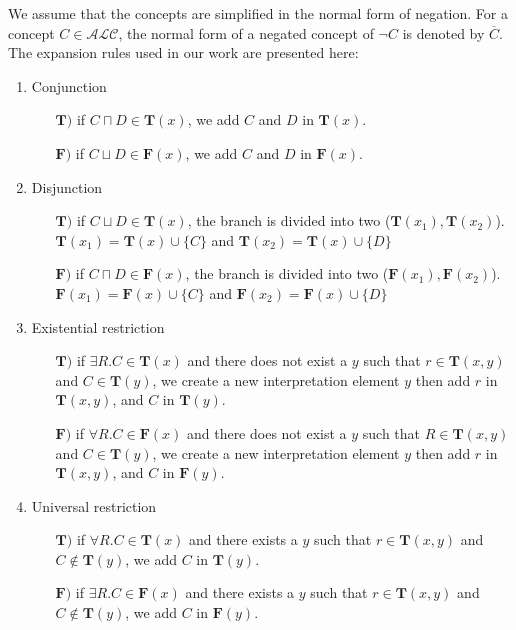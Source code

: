 \documentclass{article}
\begin{document}
We assume that the concepts are simplified in the normal form of negation. For a concept $C \in \mathcal{ALC} $, the normal form of a negated concept of $\neg C$ is denoted by $\overline{C}$.
The expansion rules used in our work are presented here:
\begin{enumerate}
	 \item Conjunction
	       \begin{itemize}
	        \item  [$\mathbf{T)}$] if $C\sqcap D \in \mathbf{T}(x)$, we add $C$ and $D$ in $\mathbf{T}(x)$.
	        \item  [$\mathbf{F)}$] if $C\sqcup D \in \mathbf{F}(x)$, we add $C$ and $D$ in $\mathbf{F}(x)$.
	       \end{itemize}
	 \item Disjunction
	       \begin{itemize}
		\item  [$\mathbf{T)}$]  if $C\sqcup D \in \mathbf{T}(x)$, the branch is divided into two  ($\mathbf{T}(x_1),\mathbf{T}(x_2)$).
			$\mathbf{T}(x_1)= \mathbf{T}(x) \cup \{C\}$ and $\mathbf{T}(x_2)=\mathbf{T}(x) \cup \{D\}$
	        \item  [$\mathbf{F)}$]  if $C\sqcap D \in \mathbf{F}(x)$, the branch is divided into two ($\mathbf{F}(x_1),\mathbf{F}(x_2)$).
	        $\mathbf{F}(x_1)= \mathbf{F}(x) \cup \{C\}$ and $\mathbf{F}(x_2)=\mathbf{F}(x) \cup \{D\}$
	       \end{itemize}
	 \item Existential restriction
	       \begin{itemize}
	       \item  [$\mathbf{T)}$]  if $\exists R.C \in \mathbf{T}(x)$ and there does not exist a $y$ such that $r \in \mathbf{T}(x,y)$ and $C \in \mathbf{T}(y)$, 
	       we create a new interpretation element $y$  then add $r$ in  $\mathbf{T}(x,y)$, and $C$ in $\mathbf{T}(y)$.
	        \item  [$\mathbf{F)}$]  if $\forall R.C \in \mathbf{F}(x)$ and there does not exist a $y$ such that $R \in \mathbf{T}(x,y)$ and $C \in \mathbf{T}(y)$, 
	       we create a new interpretation element $y$ then add $r$ in  $\mathbf{T}(x,y)$, and $C$ in $\mathbf{F}(y)$.
	       \end{itemize}
	 \item Universal restriction
	       \begin{itemize}
 	        \item  [$\mathbf{T)}$]  if $\forall R.C \in \mathbf{T}(x)$ and there exists a $y$ such that $r \in \mathbf{T}(x,y)$ and $C\notin\mathbf{T}(y)$, we add $C$ in  $\mathbf{T}(y)$.
	        \item  [$\mathbf{F)}$]  if $\exists R.C \in \mathbf{F}(x)$ and there exists a $y$ such that $r \in \mathbf{T}(x,y)$ and $C\notin\mathbf{T}(y)$, we add $C$ in  $\mathbf{F}(y)$.
	       \end{itemize}	


\end{enumerate}
\end{document}

